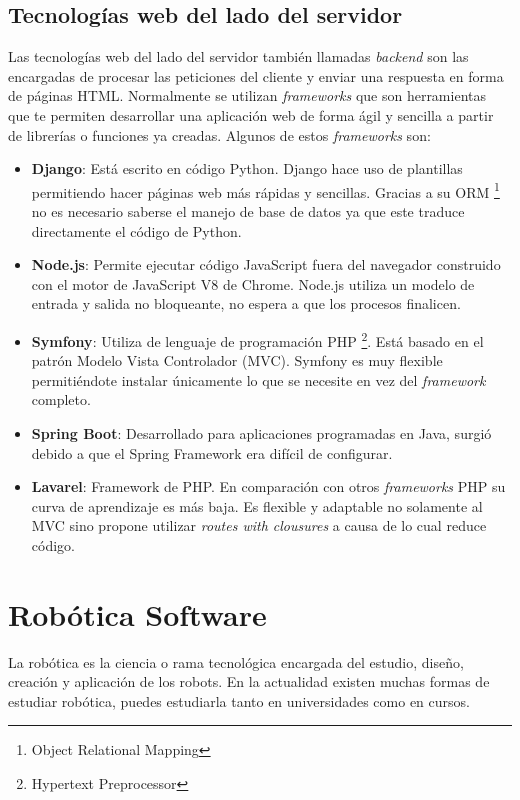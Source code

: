 \subsection{Tecnologías web del lado del servidor}
Las tecnologías web del lado del servidor también llamadas \textit{backend} son las encargadas de procesar las peticiones del cliente y enviar una respuesta en forma de páginas HTML. Normalmente se utilizan \textit{frameworks }que son herramientas que te permiten desarrollar una aplicación web de forma ágil y sencilla a partir de librerías o funciones ya creadas. Algunos de estos \textit{frameworks} son:

\begin{itemize}
  \item \textbf{Django}: Está escrito en código Python. Django hace uso de plantillas permitiendo hacer páginas web más rápidas y sencillas. Gracias a su ORM \footnote{Object Relational Mapping
} no es necesario saberse el manejo de base de datos ya que este traduce directamente el código de Python.
  \item \textbf{Node.js}: Permite ejecutar código JavaScript fuera del navegador construido con el motor de JavaScript V8 de Chrome. Node.js utiliza un modelo de entrada y salida no bloqueante, no espera a que los procesos finalicen.
  \item \textbf{Symfony}: Utiliza de lenguaje de programación PHP \footnote{Hypertext Preprocessor}. Está basado en el patrón Modelo Vista Controlador (MVC). Symfony es muy flexible permitiéndote instalar únicamente lo que se necesite en vez del \textit{framework} completo.
  \item \textbf{Spring Boot}: Desarrollado para aplicaciones programadas en Java, surgió debido a que el Spring Framework era difícil de configurar. 
\item \textbf{Lavarel}: Framework de PHP. En comparación con otros \textit{frameworks }PHP su curva de aprendizaje es más baja. Es flexible y adaptable no solamente al MVC sino propone utilizar \textit{routes with clousures} a causa de lo cual reduce código.\cite{lavarel}
\end{itemize}

\section{Robótica Software }
La robótica es la ciencia o rama tecnológica encargada del estudio, diseño, creación y aplicación de los robots. En la actualidad existen muchas formas de estudiar robótica, puedes estudiarla tanto en universidades como en cursos.

